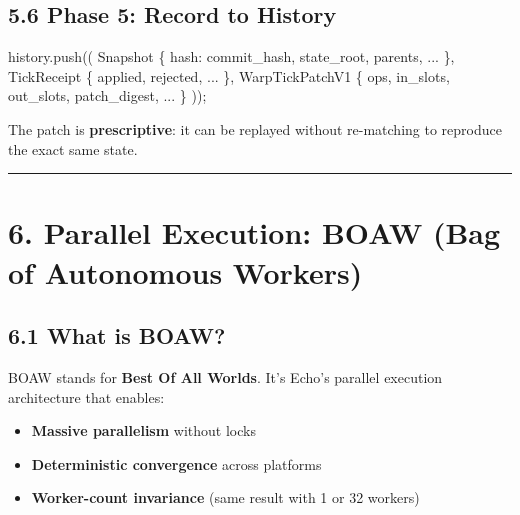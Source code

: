 \documentclass[
  11pt,
]{book}
\newenvironment{Shaded}{}{}
\newcommand{\NormalTok}[1]{#1}
\newcommand{\OperatorTok}[1]{\textcolor[rgb]{0.40,0.40,0.40}{#1}}
\providecommand{\tightlist}{%
  \setlength{\itemsep}{0pt}\setlength{\parskip}{0pt}}
\begin{document}
\subsection{5.6 Phase 5: Record to
History}\label{phase-5-record-to-history}

\begin{Shaded}
\begin{Highlighting}[]
\NormalTok{history}\OperatorTok{.}\NormalTok{push((}
\NormalTok{    Snapshot }\OperatorTok{\{}\NormalTok{ hash}\OperatorTok{:}\NormalTok{ commit\_hash}\OperatorTok{,}\NormalTok{ state\_root}\OperatorTok{,}\NormalTok{ parents}\OperatorTok{,} \OperatorTok{...} \OperatorTok{\},}
\NormalTok{    TickReceipt }\OperatorTok{\{}\NormalTok{ applied}\OperatorTok{,}\NormalTok{ rejected}\OperatorTok{,} \OperatorTok{...} \OperatorTok{\},}
\NormalTok{    WarpTickPatchV1 }\OperatorTok{\{}\NormalTok{ ops}\OperatorTok{,}\NormalTok{ in\_slots}\OperatorTok{,}\NormalTok{ out\_slots}\OperatorTok{,}\NormalTok{ patch\_digest}\OperatorTok{,} \OperatorTok{...} \OperatorTok{\}}
\NormalTok{))}\OperatorTok{;}
\end{Highlighting}
\end{Shaded}

The patch is \textbf{prescriptive}: it can be replayed without
re-matching to reproduce the exact same state.

\begin{center}\rule{0.5\linewidth}{0.5pt}\end{center}

\section{6. Parallel Execution: BOAW (Bag of Autonomous
Workers)}\label{parallel-execution-boaw-bag-of-autonomous-workers}

\subsection{6.1 What is BOAW?}\label{what-is-boaw}

BOAW stands for \textbf{Best Of All Worlds}. It's Echo's parallel
execution architecture that enables:

\begin{itemize}
\tightlist
\item
  \textbf{Massive parallelism} without locks
\item
  \textbf{Deterministic convergence} across platforms
\item
  \textbf{Worker-count invariance} (same result with 1 or 32 workers)
\end{itemize}
\end{document}
